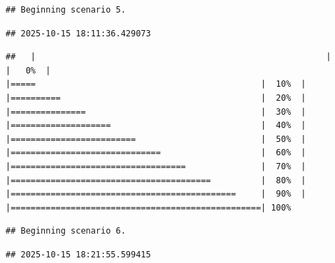 \documentclass[
]{article}
\begin{document}
\begin{verbatim}
## Beginning scenario 5.
\end{verbatim}

\begin{verbatim}
## 2025-10-15 18:11:36.429073
\end{verbatim}

\begin{verbatim}
##   |                                                          |                                                  |   0%  |                                                          |=====                                             |  10%  |                                                          |==========                                        |  20%  |                                                          |===============                                   |  30%  |                                                          |====================                              |  40%  |                                                          |=========================                         |  50%  |                                                          |==============================                    |  60%  |                                                          |===================================               |  70%  |                                                          |========================================          |  80%  |                                                          |=============================================     |  90%  |                                                          |==================================================| 100%
\end{verbatim}

\begin{verbatim}
## Beginning scenario 6.
\end{verbatim}

\begin{verbatim}
## 2025-10-15 18:21:55.599415
\end{verbatim}
\end{document}
